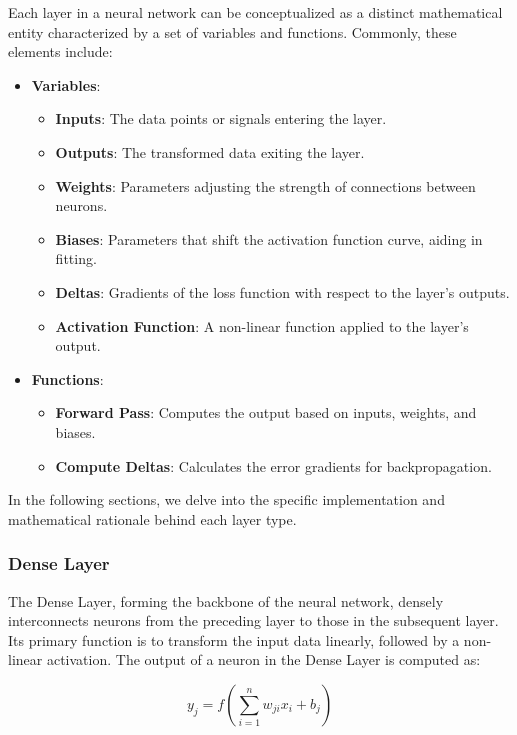 \documentclass{article}
\begin{document}
Each layer in a neural network can be conceptualized as a distinct mathematical entity characterized by a set of variables and functions. Commonly, these elements include:

\begin{itemize}
    \item \textbf{Variables}:
    \begin{itemize}
        \item \textbf{Inputs}: The data points or signals entering the layer.
        \item \textbf{Outputs}: The transformed data exiting the layer.
        \item \textbf{Weights}: Parameters adjusting the strength of connections between neurons.
        \item \textbf{Biases}: Parameters that shift the activation function curve, aiding in fitting.
        \item \textbf{Deltas}: Gradients of the loss function with respect to the layer's outputs.
        \item \textbf{Activation Function}: A non-linear function applied to the layer's output.
    \end{itemize}
    \item \textbf{Functions}:
    \begin{itemize}
        \item \textbf{Forward Pass}: Computes the output based on inputs, weights, and biases.
        \item \textbf{Compute Deltas}: Calculates the error gradients for backpropagation.
    \end{itemize}
\end{itemize}

In the following sections, we delve into the specific implementation and mathematical rationale behind each layer type.

\subsubsection{Dense Layer}

The Dense Layer, forming the backbone of the neural network, densely interconnects neurons from the preceding layer to those in the subsequent layer. Its primary function is to transform the input data linearly, followed by a non-linear activation. The output of a neuron in the Dense Layer is computed as:

\begin{equation}
    y_j = f\left(\sum_{i=1}^{n} w_{ji} x_i + b_j\right)
\end{equation}
\end{document}
